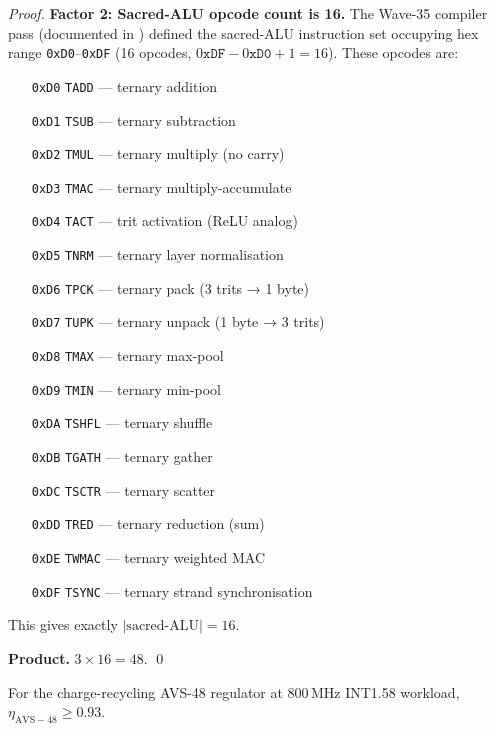 \begin{proof}
\textbf{Factor 2: Sacred-ALU opcode count is 16.}
The Wave-35 compiler pass (documented in \cite{wave35squeeze}) defined the
sacred-ALU instruction set occupying hex range \texttt{0xD0}--\texttt{0xDF}
(16 opcodes, $0\texttt{xDF} - 0\texttt{xD0} + 1 = 16$).  These opcodes are:
\begin{enumerate}
  \item[\texttt{0xD0}] \texttt{TADD}  — ternary addition
  \item[\texttt{0xD1}] \texttt{TSUB}  — ternary subtraction
  \item[\texttt{0xD2}] \texttt{TMUL}  — ternary multiply (no carry)
  \item[\texttt{0xD3}] \texttt{TMAC}  — ternary multiply-accumulate
  \item[\texttt{0xD4}] \texttt{TACT}  — trit activation (ReLU analog)
  \item[\texttt{0xD5}] \texttt{TNRM}  — ternary layer normalisation
  \item[\texttt{0xD6}] \texttt{TPCK}  — ternary pack (3 trits → 1 byte)
  \item[\texttt{0xD7}] \texttt{TUPK}  — ternary unpack (1 byte → 3 trits)
  \item[\texttt{0xD8}] \texttt{TMAX}  — ternary max-pool
  \item[\texttt{0xD9}] \texttt{TMIN}  — ternary min-pool
  \item[\texttt{0xDA}] \texttt{TSHFL} — ternary shuffle
  \item[\texttt{0xDB}] \texttt{TGATH} — ternary gather
  \item[\texttt{0xDC}] \texttt{TSCTR} — ternary scatter
  \item[\texttt{0xDD}] \texttt{TRED}  — ternary reduction (sum)
  \item[\texttt{0xDE}] \texttt{TWMAC} — ternary weighted MAC
  \item[\texttt{0xDF}] \texttt{TSYNC} — ternary strand synchronisation
\end{enumerate}
This gives exactly $|\text{sacred-ALU}| = 16$.

\textbf{Product.}
$3 \times 16 = 48$.  \qed
\end{proof}

\begin{theorem}
\label{thm:eta_93}
For the charge-recycling AVS-48 regulator at 800\,MHz INT1.58 workload,
$\eta_{\mathrm{AVS-48}} \geq 0.93$.
\end{theorem}

